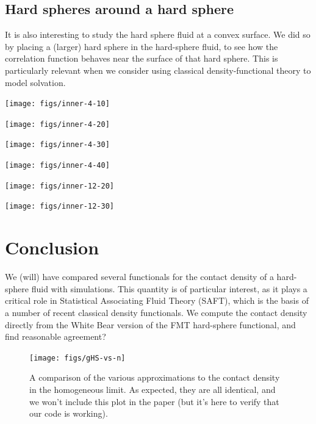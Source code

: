 \documentclass[letterpaper,twocolumn,amsmath,amssymb,jcp,10pt,aip]{revtex4-1}
\begin{document}
\subsection{Hard spheres around a hard sphere}

It is also interesting to study the hard sphere fluid at a convex
surface.  We did so by placing a (larger) hard sphere in the
hard-sphere fluid, to see how the correlation function behaves near
the surface of that hard sphere.  This is particularly relevant when
we consider using classical density-functional theory to model
solvation.

\begin{center}
  \texttt{[image: figs/inner-4-10]}
\end{center}
\begin{center}
  \texttt{[image: figs/inner-4-20]}
\end{center}
\begin{center}
  \texttt{[image: figs/inner-4-30]}
\end{center}
\begin{center}
  \texttt{[image: figs/inner-4-40]}
\end{center}
\begin{center}
  \texttt{[image: figs/inner-12-20]}
\end{center}
\begin{center}
  \texttt{[image: figs/inner-12-30]}
\end{center}


\section{Conclusion}
We (will) have compared several functionals for the contact density of
a hard-sphere fluid with simulations.  This quantity is of particular
interest, as it plays a critical role in Statistical Associating Fluid
Theory (SAFT), which is the basis of a number of recent classical
density functionals.  We compute the contact density directly from the
White Bear version of the FMT hard-sphere functional, and find
reasonable agreement?

\appendix

\begin{figure}
\texttt{[image: figs/gHS-vs-n]}
\caption{A comparison of the various approximations to the contact
  density in the homogeneous limit.  As expected, they are all
  identical, and we won't include this plot in the paper (but it's
  here to verify that our code is working).}
\label{fig:gHS-vs-n}
\end{figure}
\end{document}
